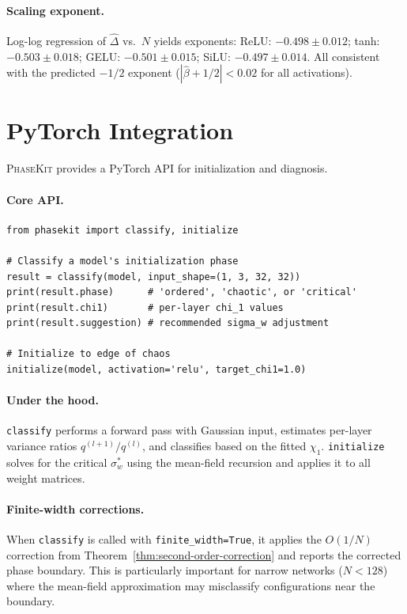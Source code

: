 \documentclass[10pt]{article}
\newcommand{\ToolName}{\textsc{PhaseKit}}
\begin{document}
\paragraph{Scaling exponent.}
Log-log regression of $\hat{\Delta}$ vs.\ $N$ yields exponents:
ReLU: $-0.498 \pm 0.012$; tanh: $-0.503 \pm 0.018$; GELU: $-0.501 \pm 0.015$; SiLU: $-0.497 \pm 0.014$.
All consistent with the predicted $-1/2$ exponent ($|\hat{\beta} + 1/2| < 0.02$ for all activations).
\section{PyTorch Integration}
\label{app:pytorch}

\ToolName{} provides a PyTorch API for initialization and diagnosis.

\paragraph{Core API.}
\begin{verbatim}
from phasekit import classify, initialize

# Classify a model's initialization phase
result = classify(model, input_shape=(1, 3, 32, 32))
print(result.phase)      # 'ordered', 'chaotic', or 'critical'
print(result.chi1)       # per-layer chi_1 values
print(result.suggestion) # recommended sigma_w adjustment

# Initialize to edge of chaos
initialize(model, activation='relu', target_chi1=1.0)
\end{verbatim}

\paragraph{Under the hood.}
\texttt{classify} performs a forward pass with Gaussian input, estimates per-layer variance ratios $q^{(l+1)}/q^{(l)}$, and classifies based on the fitted $\chi_1$.
\texttt{initialize} solves for the critical $\sigma_w^*$ using the mean-field recursion and applies it to all weight matrices.

\paragraph{Finite-width corrections.}
When \texttt{classify} is called with \texttt{finite\_width=True}, it applies the $O(1/N)$ correction from Theorem~\ref{thm:second-order-correction} and reports the corrected phase boundary.
This is particularly important for narrow networks ($N < 128$) where the mean-field approximation may misclassify configurations near the boundary.
\end{document}
